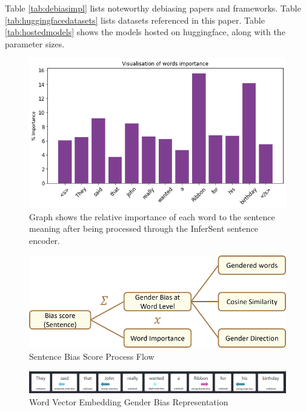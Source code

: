 \documentclass[11pt]{article}
\begin{document}
\begin{appendices}
Table \ref{tab:debiasimpl} lists noteworthy debiasing papers and frameworks. Table \ref{tab:huggingfacedatasets} lists datasets referenced in this paper. Table \ref{tab:hostedmodels} shows the models hosted on huggingface, along with the parameter sizes. 



\begin{figure}[H]
  \includegraphics[width=\linewidth]{img/sentence-word-impt.png}
  \caption{Graph shows the relative importance of each word to the sentence meaning after being processed through the InferSent sentence encoder.}
  \label{fig:sentencewordimpt}
\end{figure}

\begin{figure}[H]
  \includegraphics[width=\linewidth]{sentence-bias-score.png}
  \caption{Sentence Bias Score Process Flow}
  \label{fig:sentencescore}
\end{figure}

\begin{figure}[H]
  \includegraphics[width=\linewidth]{img/word-level-bias.png}
  \caption{Word Vector Embedding Gender Bias Representation}
  \label{fig:world-level-bias}
\end{figure}


\end{appendices}
\end{document}
